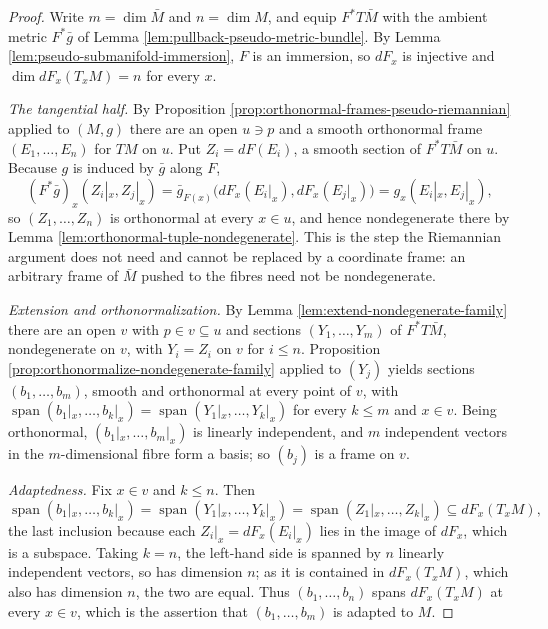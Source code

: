 \begin{proof}
\leanok
{}
Write $m = \dim\bar{M}$ and $n = \dim M$, and equip $F^*T\bar{M}$ with the ambient metric $F^*\bar{g}$ of Lemma \ref{lem:pullback-pseudo-metric-bundle}. By Lemma \ref{lem:pseudo-submanifold-immersion}, $F$ is an immersion, so $dF_x$ is injective and $\dim dF_x(T_xM) = n$ for every $x$.

\emph{The tangential half.} By Proposition \ref{prop:orthonormal-frames-pseudo-riemannian} applied to $(M,g)$ there are an open $u \ni p$ and a smooth orthonormal frame $(E_1,\ldots,E_n)$ for $TM$ on $u$. Put $Z_i = dF(E_i)$, a smooth section of $F^*T\bar{M}$ on $u$. Because $g$ is induced by $\bar{g}$ along $F$,
\[
  (F^*\bar{g})_x(Z_i|_x, Z_j|_x) = \bar{g}_{F(x)}\bigl(dF_x(E_i|_x), dF_x(E_j|_x)\bigr) = g_x(E_i|_x, E_j|_x),
\]
so $(Z_1,\ldots,Z_n)$ is orthonormal at every $x \in u$, and hence nondegenerate there by Lemma \ref{lem:orthonormal-tuple-nondegenerate}. This is the step the Riemannian argument does not need and cannot be replaced by a coordinate frame: an arbitrary frame of $\bar{M}$ pushed to the fibres need not be nondegenerate.

\emph{Extension and orthonormalization.} By Lemma \ref{lem:extend-nondegenerate-family} there are an open $v$ with $p \in v \subseteq u$ and sections $(Y_1,\ldots,Y_m)$ of $F^*T\bar{M}$, nondegenerate on $v$, with $Y_i = Z_i$ on $v$ for $i \leq n$. Proposition \ref{prop:orthonormalize-nondegenerate-family} applied to $(Y_j)$ yields sections $(b_1,\ldots,b_m)$, smooth and orthonormal at every point of $v$, with $\operatorname{span}(b_1|_x,\ldots,b_k|_x) = \operatorname{span}(Y_1|_x,\ldots,Y_k|_x)$ for every $k \leq m$ and $x \in v$. Being orthonormal, $(b_1|_x,\ldots,b_m|_x)$ is linearly independent, and $m$ independent vectors in the $m$-dimensional fibre form a basis; so $(b_j)$ is a frame on $v$.

\emph{Adaptedness.} Fix $x \in v$ and $k \leq n$. Then
\[
  \operatorname{span}(b_1|_x,\ldots,b_k|_x) = \operatorname{span}(Y_1|_x,\ldots,Y_k|_x) = \operatorname{span}(Z_1|_x,\ldots,Z_k|_x) \subseteq dF_x(T_xM),
\]
the last inclusion because each $Z_i|_x = dF_x(E_i|_x)$ lies in the image of $dF_x$, which is a subspace. Taking $k = n$, the left-hand side is spanned by $n$ linearly independent vectors, so has dimension $n$; as it is contained in $dF_x(T_xM)$, which also has dimension $n$, the two are equal. Thus $(b_1,\ldots,b_n)$ spans $dF_x(T_xM)$ at every $x \in v$, which is the assertion that $(b_1,\ldots,b_m)$ is adapted to $M$.
\end{proof}

